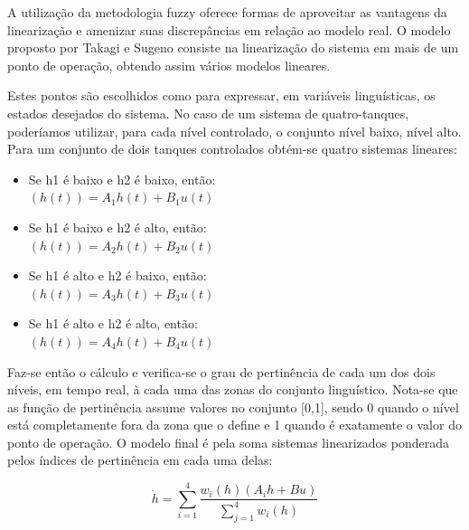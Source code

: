 \documentclass[a0,portrait]{a0poster}
\begin{document}
\begin{multicols}{2}
\color{Black}

A utilização da metodologia fuzzy oferece formas de aproveitar as vantagens da linearização e amenizar suas discrepâncias em relação ao modelo real. O modelo proposto por Takagi e Sugeno consiste na linearização do sistema em mais de um ponto de operação, obtendo assim vários modelos lineares. 

Estes pontos são escolhidos como para expressar, em variáveis linguísticas, os estados desejados do sistema. No caso de um sistema de quatro-tanques, poderíamos utilizar, para cada nível controlado, o conjunto {nível baixo, nível alto}. Para um conjunto de dois tanques controlados obtém-se quatro sistemas lineares:

\begin{center}
	\begin{minipage}{.2\textwidth}
		\begin{itemize}
			\item Se h1 é baixo e h2 é baixo, então: \\
			$(h(t)) = A_1h(t)+B_1u(t)$
			\item Se h1 é baixo e h2 é alto, então: \\
			$(h(t)) = A_2h(t)+B_2u(t)$
			\item Se h1 é alto e h2 é baixo, então: \\
			$(h(t)) = A_3h(t)+B_3u(t)$
			\item Se h1 é alto e h2 é alto, então: \\
			$(h(t)) = A_4h(t)+B_4u(t)$
		\end{itemize}
	\end{minipage}
\end{center}

Faz-se então o cálculo e verifica-se o grau de pertinência de cada um dos dois níveis, em tempo real, à cada uma das zonas do conjunto linguístico. Nota-se que as função de pertinência assume valores no conjunto [0,1], sendo 0 quando o nível está completamente fora da zona que o define e 1 quando é exatamente o valor do ponto de operação. O modelo final é pela soma sistemas linearizados ponderada pelos índices de pertinência em cada uma delas:

\begin{equation}
	\dot{h} = \sum_{i=1}^{4} \dfrac{w_i(h)(A_ih+Bu)}{\sum_{j=1}^{4}w_i(h)}
\end{equation}

\vspace{1cm}
\color{DarkSlateGray} %


\end{multicols}
\end{document}
